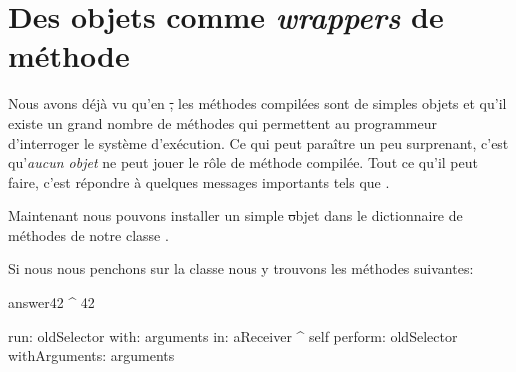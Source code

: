 \documentclass[a4paper,10pt,twoside]{book}
\begin{document}
\section{Des objets comme \emph{wrappers} de méthode}

Nous avons déjà vu qu'en \st, les méthodes compilées sont de simples objets et qu'il existe un grand nombre de méthodes qui permettent au programmeur d'interroger le système d'exécution.
Ce qui peut paraître un peu surprenant, c'est qu'\emph{aucun objet} ne peut jouer le rôle de méthode compilée. Tout ce qu'il peut faire, c'est répondre à quelques messages importants tels que .


Maintenant nous pouvons installer un simple \st objet
dans le dictionnaire de méthodes de notre classe .


Si nous nous penchons sur la classe  nous y trouvons les méthodes suivantes:
\begin{code}{}
answer42
	^ 42

run: oldSelector with: arguments in: aReceiver
	^ self perform: oldSelector withArguments: arguments
\end{code}
\end{document}
